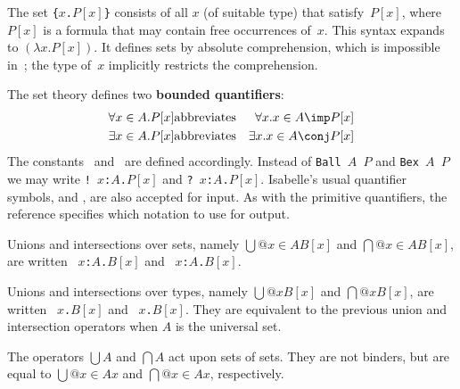 The set \hbox{\tt\{$x$.$P[x]$\}} consists of all $x$ (of suitable type)
that satisfy~$P[x]$, where $P[x]$ is a formula that may contain free
occurrences of~$x$.  This syntax expands to $(\lambda
x.P[x])$.  It defines sets by absolute comprehension, which is impossible
in~{\ZF}; the type of~$x$ implicitly restricts the comprehension.

The set theory defines two {\bf bounded quantifiers}:
\begin{eqnarray*}
   \forall x\in A.P[x] &\hbox{abbreviates}& \forall x. x\in A\imp P[x] \\
   \exists x\in A.P[x] &\hbox{abbreviates}& \exists x. x\in A\conj P[x]
\end{eqnarray*}
The constants~ and~ are defined
accordingly.  Instead of {\tt Ball $A$ $P$} and {\tt Bex $A$ $P$} we may
write
%
\hbox{\tt !~$x$:$A$.$P[x]$} and \hbox{\tt ?~$x$:$A$.$P[x]$}.  Isabelle's
usual quantifier symbols,  and , are also accepted
for input.  As with the primitive quantifiers, the {\ML} reference
 specifies which notation to use for output.

Unions and intersections over sets, namely $\bigcup@{x\in A}B[x]$ and
$\bigcap@{x\in A}B[x]$, are written 
~\hbox{\tt$x$:$A$.$B[x]$} and
~\hbox{\tt$x$:$A$.$B[x]$}.  

Unions and intersections over types, namely $\bigcup@x B[x]$ and $\bigcap@x
B[x]$, are written ~\hbox{\tt$x$.$B[x]$} and
~\hbox{\tt$x$.$B[x]$}.  They are equivalent to the previous
union and intersection operators when $A$ is the universal set.

The operators $\bigcup A$ and $\bigcap A$ act upon sets of sets.  They are
not binders, but are equal to $\bigcup@{x\in A}x$ and $\bigcap@{x\in A}x$,
respectively.


